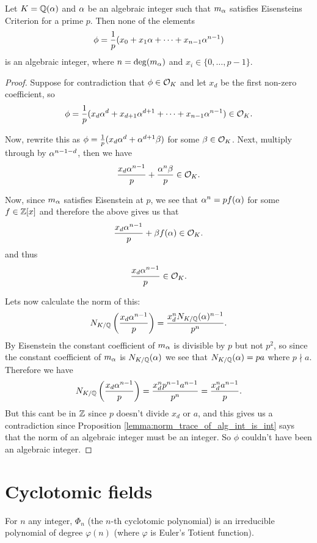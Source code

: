 \begin{lemma}\label{lemma:eis_crit_and_alg_ints}
	Let $K=\mathbb{Q}(\alpha)$ and $\alpha$ be an algebraic integer such that $m_\alpha$ satisfies Eisensteins Criterion for a prime $p$. Then none of the elements \[\phi=\frac{1}{p}(x_0+x_1\alpha+\cdots+x_{n-1}\alpha^{n-1})\] is an algebraic integer, where $n=\deg(m_\alpha)$ and $x_i \in \{0,\dots,p-1\}.$
\end{lemma}


\begin{proof}
	Suppose for contradiction that $\phi \in \mathcal{O}_K$ and let $x_d$ be the first non-zero coefficient, so \[\phi=\frac{1}{p}(x_d\alpha^d+x_{d+1}\alpha^{d+1}+\cdots+x_{n-1}\alpha^{n-1}) \in \mathcal{O}_K.\]

	Now, rewrite this as $\phi=\frac{1}{p}(x_d\alpha^d +\alpha^{d+1}\beta)$ for some $\beta \in \mathcal{O}_K$. Next, multiply through by $\alpha^{n-1-d}$, then we have \[\frac{x_d\alpha^{n-1}}{p}+\frac{\alpha^n\beta}{p} \in \mathcal{O}_K.\]

	Now, since  $m_\alpha$ satisfies Eisenstein at $p$, we see that $\alpha^n=pf(\alpha)$ for some $f \in \mathbb{Z}[x]$ and therefore the above gives us that \[\frac{x_d\alpha^{n-1}}{p}+\beta f(\alpha) \in \mathcal{O}_K.\] and thus \[\frac{x_d\alpha^{n-1}}{p} \in \mathcal{O}_K.\]

	Lets now calculate the norm of this: \[N_{K/\mathbb{Q}} \left(\frac{x_d\alpha^{n-1}}{p} \right)=\frac{x_d^n N_{K/\mathbb{Q}}(\alpha)^{n-1}}{p^n}.\] By Eisenstein the constant coefficient of $m_\alpha$ is divisible by $p$ but not $p^2$, so since the constant coefficient of $m_\alpha$ is $N_{K/\mathbb{Q}}(\alpha)$ we see that $N_{K/\mathbb{Q}}(\alpha)=p a$ where $p \nmid a$. Therefore we have \[N_{K/\mathbb{Q}} \left(\frac{x_d\alpha^{n-1}}{p} \right)=\frac{x_d^n p^{n-1}a^{n-1}}{p^n}= \frac{x_d^n a^{n-1}}{p}.\] But this cant be in $\mathbb{Z}$ since $p$ doesn't divide $x_d$ or $a$, and this gives us a contradiction since  Proposition \ref{lemma:norm_trace_of_alg_int_is_int} says that the norm of an algebraic integer must be an integer. So $\phi$ couldn't have been an algebraic integer.


\end{proof}

\section{Cyclotomic fields}


\begin{lemma}\label{lemma:cyclo_poly} \leanok
	For $n$ any integer, $\Phi_n$ (the $n$-th cyclotomic polynomial) is an irreducible polynomial of degree $\varphi(n)$ (where $\varphi$ is Euler's Totient function).
\end{lemma}





